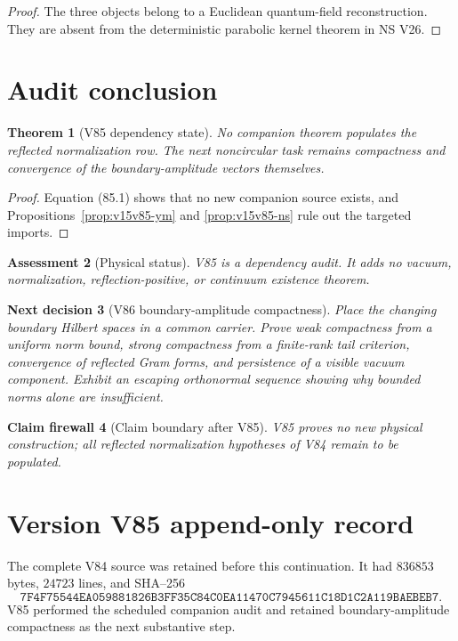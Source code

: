 \documentclass[11pt]{article}
\newtheorem{theorem}{Theorem}[section]
\newtheorem{firewall}[theorem]{Claim firewall}
\newtheorem{decision}[theorem]{Next decision}
\newtheorem{assessment}[theorem]{Assessment}
\theoremstyle{remark}
\begin{document}
\begin{proof}
The three objects belong to a Euclidean quantum-field
reconstruction.  They are absent from the deterministic parabolic
kernel theorem in NS V26.
\end{proof}

\section{Audit conclusion}

\begin{theorem}[V85 dependency state]
\label{thm:v15v85-conclusion}
No companion theorem populates the reflected normalization row.
The next noncircular task remains compactness and convergence of
the boundary-amplitude vectors themselves.
\end{theorem}

\begin{proof}
Equation (85.1) shows that no new companion source exists, and
Propositions~\ref{prop:v15v85-ym} and
\ref{prop:v15v85-ns} rule out the targeted imports.
\end{proof}

\begin{assessment}[Physical status]
\label{ass:v15v85-status}
V85 is a dependency audit.  It adds no vacuum, normalization,
reflection-positive, or continuum existence theorem.
\end{assessment}

\begin{decision}[V86 boundary-amplitude compactness]
\label{dec:v15v85-next}
Place the changing boundary Hilbert spaces in a common carrier.
Prove weak compactness from a uniform norm bound, strong compactness
from a finite-rank tail criterion, convergence of reflected Gram
forms, and persistence of a visible vacuum component.  Exhibit an
escaping orthonormal sequence showing why bounded norms alone are
insufficient.
\end{decision}

\begin{firewall}[Claim boundary after V85]
\label{fire:v15v85}
V85 proves no new physical construction; all reflected
normalization hypotheses of V84 remain to be populated.
\end{firewall}

\section*{Version V85 append-only record}
The complete V84 source was retained before this continuation.  It
had \(836853\) bytes, \(24723\) lines, and SHA--256
\[
 \texttt{7F4F75544EA059881826B3FF35C84C0EA11470C7945611C18D1C2A119BAEBEB7}.
\]
V85 performed the scheduled companion audit and retained
boundary-amplitude compactness as the next substantive step.
\end{document}
